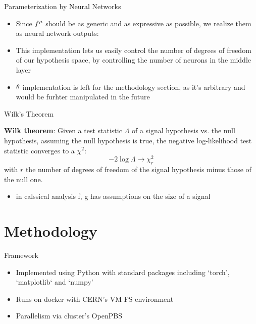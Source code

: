 \documentclass[notheorems]{beamer}
\begin{document}
\begin{frame}{Parameterization by Neural Networks}
    \begin{itemize}
        \item Since ${f^{{\mu}}}$ should be as generic and as expressive as possible, we realize them as neural network outputs:
    \end{itemize}
    \begin{itemize}
        \item This implementation lets us easily control the number of degrees of freedom of our hypothesis space, by controlling the number of neurons in the middle layer
        \item ${\theta}$ implementation is left for the methodology section, as it's arbitrary and would be furhter manipulated in the future
    \end{itemize}
\end{frame}

\begin{frame}{Wilk's Theorem}
    \begin{theorem}
        \textbf{Wilk theorem}: Given a test statistic $\Lambda$ of a signal hypothesis vs. the null hypothesis, assuming the null hypothesis is true, the negative log-likelihood test statistic converges to a $\chi^2$:
        \begin{equation*}
            -2 \log \Lambda \to \chi^2_r
        \end{equation*}
        with $r$ the number of degrees of freedom of the signal hypothesis minus those of the null one.
    \end{theorem}
    \begin{itemize}
        \item in calssical analysis f, g has assumptions on the size of a signal
    \end{itemize}
\end{frame}

\section{Methodology}

\begin{frame}{Framework}
    \begin{itemize}
        \item Implemented using Python with standard packages including `torch', `matplotlib` and `numpy'
        \item Runs on docker with CERN's VM FS environment
        \item Parallelism via cluster's OpenPBS
    \end{itemize}
\end{frame}
\end{document}

